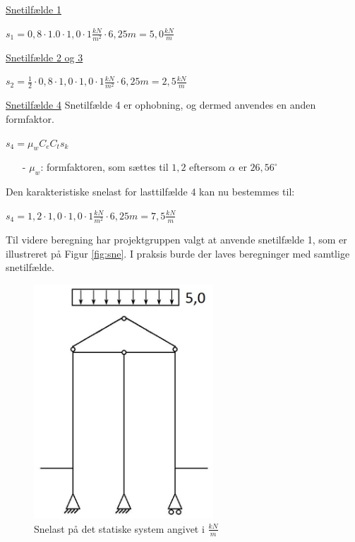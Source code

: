 \underline{Snetilfælde 1}
\begin{center}
$s_1=0,\!8\cdot 1.0\cdot 1,\!0\cdot 1 \frac{kN}{m^2}\cdot 6,\!25 m=5,\!0 \frac{kN}{m}$
\end{center}
\underline{Snetilfælde 2 og 3}
\begin{center}
$s_2=\frac{1}{2}\cdot 0,\!8\cdot 1,\!0\cdot 1,\!0\cdot 1 \frac{kN}{m^2}\cdot 6,\!25 m=2,\!5 \frac{kN}{m}$
\end{center}
\underline{Snetilfælde 4}
\newline
\newline
Snetilfælde 4 er ophobning, og dermed anvendes en anden formfaktor.
\begin{center}
	$s_4=\mu_wC_eC_ts_k$
\end{center}
\begin{itemize}
	\item[-] $\mu_w$: formfaktoren, som sættes til $1,\!2$ eftersom $\alpha$ er $26,\!56^{\circ}$ \citep[ kapitel 5.3.3]{EU91}
\end{itemize}
Den karakteristiske snelast for lasttilfælde 4 kan nu bestemmes til:
\begin{center}
	$s_4=1,\!2\cdot 1,\!0\cdot 1,\!0\cdot 1 \frac{kN}{m^2}\cdot 6,\!25 m = 7,\!5 \frac{kN}{m}$
\end{center}
Til videre beregning har projektgruppen valgt at anvende snetilfælde 1, som er illustreret på Figur \ref{fig:sne}. I praksis burde der laves beregninger med samtlige snetilfælde.

\begin{figure}[htbp]
	\centering
	\includegraphics[width=0.6\textwidth]{billeder/snelast.png}
	\caption{Snelast på det statiske system angivet i $\frac{kN}{m}$}
	\label{fig:snelast}
\end{figure}

